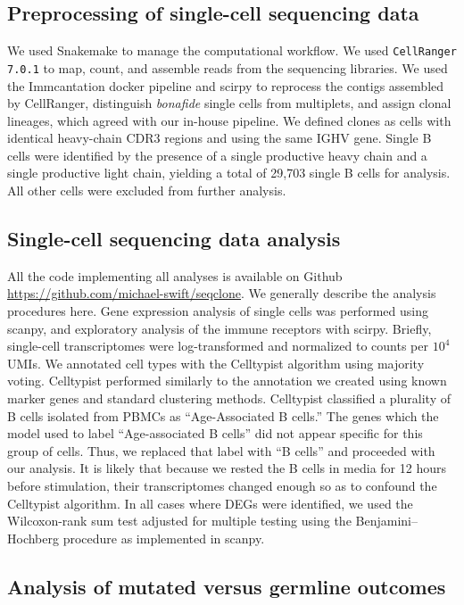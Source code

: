 \subsection{Preprocessing of single-cell sequencing data}

We used Snakemake\cite{koster2012snakemake} to manage the computational workflow. We used \verb|CellRanger 7.0.1| to map, count, and assemble reads from the sequencing libraries. We used the Immcantation docker\cite{gupta_change-o_2015} pipeline and scirpy\cite{sturm_scirpy_2020} to reprocess the contigs assembled by CellRanger, distinguish \textit{bonafide} single cells from multiplets, and assign clonal lineages, which agreed with our in-house pipeline\cite{croote_high-affinity_2018}. We defined clones as cells with identical heavy-chain CDR3 regions and using the same IGHV gene. Single B cells were identified by the presence of a single productive heavy chain and a single productive light chain, yielding a total of 29,703 single B cells for analysis. All other cells were excluded from further analysis.
\subsection{Single-cell sequencing data analysis}

All the code implementing all analyses is available on Github \url{https://github.com/michael-swift/seqclone}. We generally describe the analysis procedures here. Gene expression analysis of single cells was performed using scanpy\cite{wolf_scanpy_2018}, and exploratory analysis of the immune receptors with scirpy. Briefly, single-cell transcriptomes were log-transformed and normalized to counts per $10^4$ UMIs. We annotated cell types with the Celltypist algorithm using majority voting. Celltypist performed similarly to the annotation we created using known marker genes and standard clustering methods. Celltypist classified a plurality of B cells isolated from PBMCs as “Age-Associated B cells.” The genes which the model used to label “Age-associated B cells” did not appear specific for this group of cells. Thus, we replaced that label with “B cells” and proceeded with our analysis. It is likely that because we rested the B cells in media for 12 hours before stimulation, their transcriptomes changed enough so as to confound the Celltypist algorithm. In all cases where DEGs were identified, we used the Wilcoxon-rank sum test adjusted for multiple testing using the Benjamini–Hochberg procedure as implemented in scanpy.
\subsection{Analysis of mutated versus germline outcomes}

